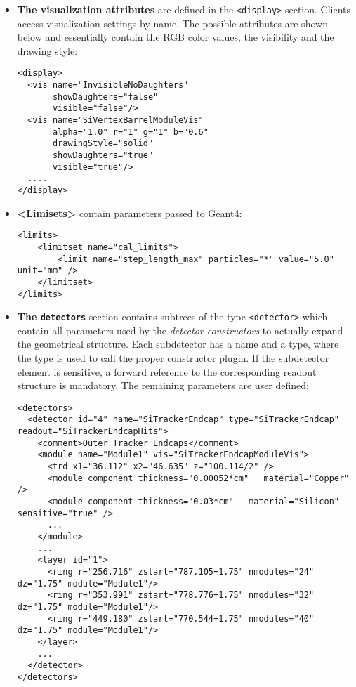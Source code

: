 \begin{itemize}
\item {\textbf{The visualization attributes}} are defined in the \texttt{<display>} section. Clients access visualization settings by name. The possible attributes are shown below and essentially contain the RGB color values, the visibility and the drawing style:
\begin{verbatim}
<display>
  <vis name="InvisibleNoDaughters"      
       showDaughters="false" 
       visible="false"/>
  <vis name="SiVertexBarrelModuleVis" 
       alpha="1.0" r="1" g="1" b="0.6" 
       drawingStyle="solid" 
       showDaughters="true" 
       visible="true"/>
  ....
</display>
\end{verbatim}

\item {\textbf{<Limisets>}} contain parameters passed to Geant4:
\begin{verbatim}
<limits>
    <limitset name="cal_limits">
        <limit name="step_length_max" particles="*" value="5.0" unit="mm" />
    </limitset>
</limits>
\end{verbatim}

\item {\textbf{The \texttt{detectors}}} section contains subtrees of the type \texttt{<detector>} which contain all parameters used by the \textit{detector constructors} to actually expand the geometrical structure. Each subdetector has a name and a type, where the type is used to call the proper constructor plugin. If the subdetector element is sensitive, a forward reference to the corresponding readout structure is mandatory. The remaining parameters are user defined:

\begin{verbatim}
<detectors>
  <detector id="4" name="SiTrackerEndcap" type="SiTrackerEndcap" readout="SiTrackerEndcapHits">
    <comment>Outer Tracker Endcaps</comment>
    <module name="Module1" vis="SiTrackerEndcapModuleVis">
      <trd x1="36.112" x2="46.635" z="100.114/2" />
      <module_component thickness="0.00052*cm"   material="Copper" />
      <module_component thickness="0.03*cm"   material="Silicon" sensitive="true" />
      ...
    </module> 
    ...
    <layer id="1">
      <ring r="256.716" zstart="787.105+1.75" nmodules="24" dz="1.75" module="Module1"/>
      <ring r="353.991" zstart="778.776+1.75" nmodules="32" dz="1.75" module="Module1"/>
      <ring r="449.180" zstart="770.544+1.75" nmodules="40" dz="1.75" module="Module1"/>
    </layer>
    ...
  </detector>
</detectors>
\end{verbatim}


\end{itemize}
